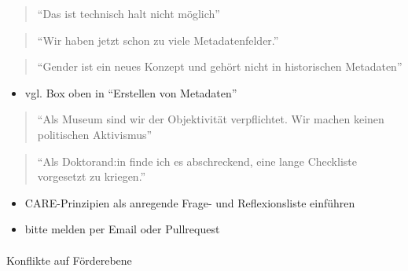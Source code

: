 \documentclass[
  letterpaper,
  DIV=11,
  numbers=noendperiod]{scrartcl}
\makeatletter
\let\oldparagraph\paragraph
\renewcommand{\paragraph}{
    \@ifstar
      \xxxParagraphStar
      \xxxParagraphNoStar
  }
\newcommand{\xxxParagraphStar}[1]{\oldparagraph*{#1}\mbox{}}
\newcommand{\xxxParagraphNoStar}[1]{\oldparagraph{#1}\mbox{}}
\providecommand{\tightlist}{%
  \setlength{\itemsep}{0pt}\setlength{\parskip}{0pt}}\usepackage{longtable,booktabs,array}
\makeatother
\begin{document}
\begin{quote}
``Das ist technisch halt nicht möglich''
\end{quote}

\begin{quote}
``Wir haben jetzt schon zu viele Metadatenfelder.''
\end{quote}

\begin{quote}
``Gender ist ein neues Konzept und gehört nicht in historischen
Metadaten''
\end{quote}

\begin{itemize}
\tightlist
\item
  vgl. Box oben in ``Erstellen von Metadaten''
\end{itemize}

\begin{quote}
``Als Museum sind wir der Objektivität verpflichtet. Wir machen keinen
politischen Aktivismus''
\end{quote}

\begin{quote}
``Als Doktorand:in finde ich es abschreckend, eine lange Checkliste
vorgesetzt zu kriegen.''
\end{quote}

\begin{itemize}
\tightlist
\item
  CARE-Prinzipien als anregende Frage- und Reflexionsliste einführen
\end{itemize}

\begin{tcolorbox}[enhanced jigsaw, colbacktitle=quarto-callout-note-color!10!white, rightrule=.15mm, coltitle=black, left=2mm, opacitybacktitle=0.6, toptitle=1mm, title=\textcolor{quarto-callout-note-color}{\faInfo}\hspace{0.5em}{Wir sammeln weitere Statements}, colback=white, colframe=quarto-callout-note-color-frame, opacityback=0, titlerule=0mm, leftrule=.75mm, breakable, bottomtitle=1mm, bottomrule=.15mm, arc=.35mm, toprule=.15mm]

\begin{itemize}
\tightlist
\item
  bitte melden per Email oder Pullrequest
\end{itemize}

\end{tcolorbox}

\paragraph{Konflikte auf
Förderebene}\label{konflikte-auf-fuxf6rderebene}
\end{document}

